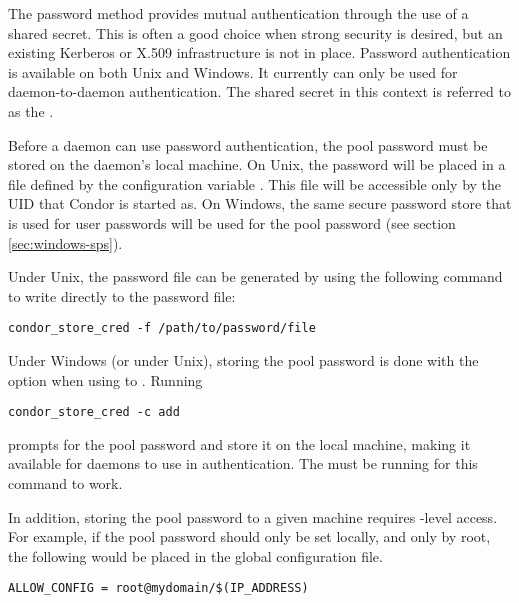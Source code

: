 The password method provides mutual authentication through the use of
a shared secret.  This is often a good choice when strong security is
desired,
but an existing Kerberos or X.509 infrastructure is not in place.
Password authentication is available on both Unix and Windows.
It currently can only be used for daemon-to-daemon authentication.
The shared secret in this context is referred to as
the .

Before a daemon can use password authentication, the pool password
must be stored on the daemon's local machine.
On Unix, the password
will be placed in a file defined by the configuration variable
. This file will be accessible only by the
UID that Condor is started as.  On Windows, the same secure password
store that is used for user passwords will be used for the pool
password (see section \ref{sec:windows-sps}).

Under Unix, the password file can be generated by using the following
command to write directly to the password file:
\begin{verbatim}
condor_store_cred -f /path/to/password/file
\end{verbatim}

Under Windows (or under Unix), storing the pool password is done
with the  option when using to  .
Running
\begin{verbatim}
condor_store_cred -c add
\end{verbatim}
prompts for the pool password and store it on the local machine,
making it available for daemons to use in authentication. The
 must be running for this command to work.

In addition, storing the pool password to a given machine requires
\verb@CONFIG@-level access. For example, if the pool password should
only be set locally, and only by root, the following would be placed in
the global configuration file.
\begin{verbatim}
ALLOW_CONFIG = root@mydomain/$(IP_ADDRESS)
\end{verbatim}

